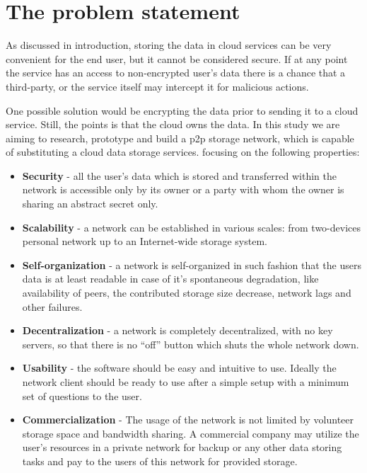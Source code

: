 \section{The problem statement}

As discussed in introduction, storing the data in cloud services
can be very convenient for the end user, but it cannot be considered
secure. If at any point the service has an access to non-encrypted
user's data there is a chance that a third-party, or the service itself
may intercept it for malicious actions.

One possible solution would be encrypting the data prior to sending it
to a cloud service. Still, the points is that the cloud owns the data.
In this study we are aiming to research, prototype and build a p2p storage
network, which is capable of substituting a cloud data storage services.
focusing on the following properties:

\begin{itemize}
\item \textbf{Security} - all the user's data which is stored and transferred
  within the network is accessible only by its owner or a party with whom the
  owner is sharing an abstract secret only.
\item \textbf{Scalability} - a network can be established in various
  scales: from two-devices personal network up to an Internet-wide storage
  system.
\item \textbf{Self-organization} - a network is self-organized in such
  fashion that the users data is at least readable in case of it's spontaneous
  degradation, like availability of peers, the contributed storage size
  decrease, network lags and other failures.
\item \textbf{Decentralization} - a network is completely decentralized,
  with no key servers, so that there is no ``off'' button which shuts the
  whole network down.
\item \textbf{Usability} - the software should be easy and intuitive to
  use. Ideally the network client should be ready to use after a  simple
  setup with a minimum set of questions to the user.
\item \textbf{Commercialization} - The usage of the network is not limited
  by volunteer storage space and bandwidth sharing. A commercial company
  may utilize the user's resources in a private network for backup or any
  other data storing tasks and pay to the users of this network for provided
  storage.
\end{itemize}


